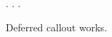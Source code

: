 \documentclass{article}
\begin{document}
\configphrase. \configsecond. .
\begin{designrule}Deferred callout works.\end{designrule}
 
\end{document}
